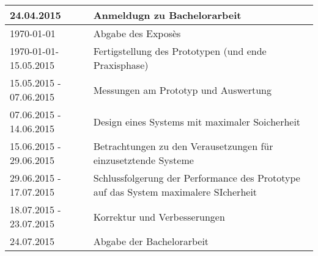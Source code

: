 \begin{tabular}{|p{5cm}|p{9cm}|}
	\hline 24.04.2015 & Anmeldugn zu Bachelorarbeit \\ 
	\hline \today & Abgabe des Exposès \\ 
	\hline \today - 15.05.2015 & Fertigstellung des Prototypen (und ende Praxisphase) \\ 
	\hline 15.05.2015 - 07.06.2015 & Messungen am Prototyp und Auswertung \\ 
	\hline 07.06.2015 - 14.06.2015 & Design eines Systems mit maximaler Soicherheit \\ 
	\hline 15.06.2015 - 29.06.2015 & Betrachtungen zu den Verausetzungen für einzusetztende Systeme \\ 
	\hline 29.06.2015 - 17.07.2015 & Schlussfolgerung der Performance des Prototype auf das System maximalere SIcherheit \\ 
	\hline 18.07.2015 - 23.07.2015 & Korrektur und Verbesserungen \\ 
	\hline 24.07.2015 & Abgabe der Bachelorarbeit \\ 

	\hline 
\end{tabular} 